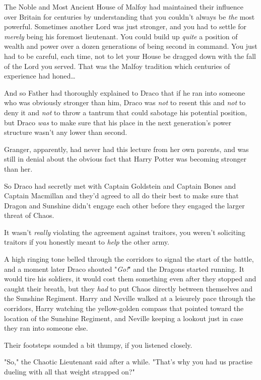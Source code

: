 The Noble and Most Ancient House of Malfoy had maintained their influence over
Britain for centuries by understanding that you couldn't always be \emph{the}
most powerful. Sometimes another Lord was just stronger, and you had to settle
for \emph{merely} being his foremost lieutenant. You could build up
\emph{quite} a position of wealth and power over a dozen generations of being
second in command. You just had to be careful, each time, not to let your House
be dragged down with the fall of the Lord you served. That was the Malfoy
tradition which centuries of experience had honed…

And so Father had thoroughly explained to Draco that if he ran into someone who
was obviously stronger than him, Draco was \emph{not} to resent this and
\emph{not} to deny it and \emph{not} to throw a tantrum that could sabotage his
potential position, but Draco \emph{was} to make sure that his place in the
next generation's power structure wasn't any lower than second.

Granger, apparently, had never had this lecture from her own parents, and
was still in denial about the obvious fact that Harry Potter was becoming
stronger than her.

So Draco had secretly met with Captain Goldstein and Captain Bones and Captain
Macmillan and they'd agreed to all do their best to make sure that Dragon and
Sunshine didn't engage each other before they engaged the larger threat of
Chaos.

It wasn't \emph{really} violating the agreement against traitors, you weren't
soliciting traitors if you honestly meant to \emph{help} the other army.

A high ringing tone belled through the corridors to signal the start of the
battle, and a moment later Draco shouted "\emph{Go!}" and the Dragons started
running. It would tire his soldiers, it would cost them something even after
they stopped and caught their breath, but they \emph{had} to put Chaos directly
between themselves and the Sunshine Regiment.
\later
Harry and Neville walked at a leisurely pace through the corridors, Harry
watching the yellow-golden compass that pointed toward the location of the
Sunshine Regiment, and Neville keeping a lookout just in case they ran into
someone else.

Their footsteps sounded a bit thumpy, if you listened closely.

"So," the Chaotic Lieutenant said after a while. "That's why you had us
practise dueling with all that weight strapped on?"

